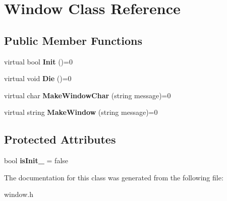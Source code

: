\hypertarget{classWindow}{}\section{Window Class Reference}
\label{classWindow}
\subsection*{Public Member Functions}
\begin{DoxyCompactItemize}
\item 
\mbox{\label{classWindow_a91ad1340d4f60465f0e6eef38f0e5fb1}} 
virtual bool {\bfseries Init} ()=0
\item 
\mbox{\label{classWindow_a5332552d06a88b58486c0ab803356d01}} 
virtual void {\bfseries Die} ()=0
\item 
\mbox{\label{classWindow_ae770439748fb6b7dcdb3071860e687b3}} 
virtual char {\bfseries Make\+Window\+Char} (string message)=0
\item 
\mbox{\label{classWindow_a3a24c6368cb054a5ca3b32db2558319f}} 
virtual string {\bfseries Make\+Window} (string message)=0
\end{DoxyCompactItemize}
\subsection*{Protected Attributes}
\begin{DoxyCompactItemize}
\item 
\mbox{\label{classWindow_a06739ea2d178febdb7f0da5f775e5ba8}} 
bool {\bfseries is\+Init\+\_\+} = false
\end{DoxyCompactItemize}


The documentation for this class was generated from the following file\+:\begin{DoxyCompactItemize}
\item 
window.\+h\end{DoxyCompactItemize}
